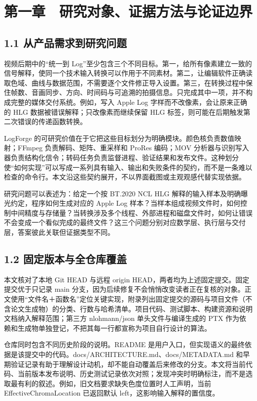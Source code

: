 \documentclass[UTF8,zihao=-4,openany]{ctexbook}
\begin{document}
\chapter*{第一章　研究对象、证据方法与论证边界}

\section*{1.1 从产品需求到研究问题}
视频后期中的“统一到 Log”至少包含三个不同目标。第一，给所有像素建立一致的信号解释，使同一个技术输入转换可以作用于不同素材。第二，让编辑软件正确读取色域、曲线与数据范围，不需要逐个文件修正导入设置。第三，在转换过程中保住帧数、音画同步、方向、时间码与可追溯的拍摄信息。只完成其中一项，并不构成完整的媒体交付系统。例如，写入 Apple Log 字样而不改像素，会让原来正确的 HLG 数据被错误解释；只改像素而继续保留 HLG 标签，则可能在后期触发第二次错误的传递函数转换。

LogForge 的可研究价值在于它把这些目标划分为明确模块。颜色核负责数值映射；FFmpeg 负责解码、矩阵、重采样和 ProRes 编码；MOV 分析器与识别写入器负责结构化信令；转码任务负责监督进程、验证结果和发布文件。这种划分使“如何实现”可以写成一系列具有输入、输出和失败条件的契约，而不是一条难以检查的命令行。本文沿这些契约展开，不以界面截图或主观观感代替实现依据。

研究问题可以表述为：给定一个按 BT.2020 NCL HLG 解释的输入样本及明确曝光约定，程序如何生成对应的 Apple Log 样本？当样本组成视频文件时，如何控制中间精度与存储量？当转换涉及多个线程、外部进程和磁盘文件时，如何让错误不会变成一个看似完成的最终文件？这三个问题分别对应数学层、执行层与交付层，答案彼此关联但证据类型不同。


\section*{1.2 固定版本与全仓库覆盖}
本文核对了本地 Git HEAD 与远程 origin HEAD，两者均为上述固定提交。固定提交优于只记录 main 分支，因为后续修复不会悄悄改变读者正在复核的对象。正文使用“文件名＋函数名”定位关键实现，附录列出固定提交的源码与项目文件（不含论文生成物）的分类、行数与哈希清单。项目代码、测试脚本、构建资源和说明文档纳入解释范围；第三方 nlohmann/json 单头文件与编译生成的 PTX 作为依赖和生成物单独登记，不把其每一行都宣称为项目自行设计的算法。

仓库同时包含不同历史阶段的说明。README 是用户入口，但实现语义的最终依据是该提交中的代码。docs/ARCHITECTURE.md、docs/METADATA.md 和早期验证记录有助于理解设计动机，却不能自动覆盖后来修改的分支。本文将当前代码、当前版本发布说明、历史测试记录依次对照；发现冲突时明确标注，而不是选取最有利的叙述。例如，旧文档要求缺失色度位置时人工声明，当前 EffectiveChromaLocation 已返回默认 left，这影响输入解释的置信度。
\end{document}
